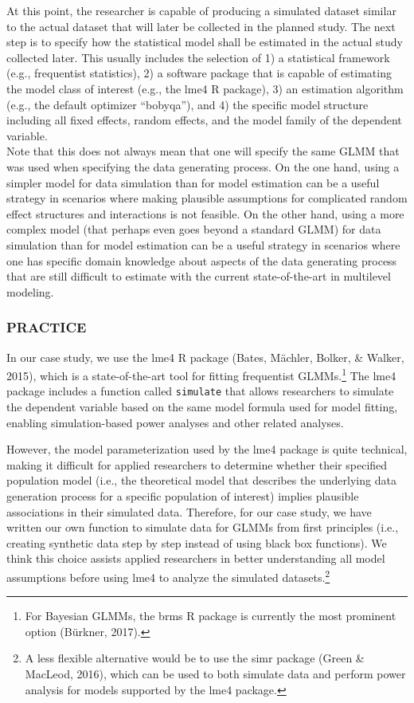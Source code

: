 \documentclass[
  man,floatsintext]{apa6}
\begin{document}
At this point, the researcher is capable of producing a simulated dataset similar to the actual dataset that will later be collected in the planned study.
The next step is to specify how the statistical model shall be estimated in the actual study collected later.
This usually includes the selection of 1) a statistical framework (e.g., frequentist statistics), 2) a software package that is capable of estimating the model class of interest (e.g., the lme4 R package), 3) an estimation algorithm (e.g., the default optimizer ``bobyqa''), and 4) the specific model structure including all fixed effects, random effects, and the model family of the dependent variable.\\
Note that this does not always mean that one will specify the same GLMM that was used when specifying the data generating process.
On the one hand, using a simpler model for data simulation than for model estimation can be a useful strategy in scenarios where making plausible assumptions for complicated random effect structures and interactions is not feasible.
On the other hand, using a more complex model (that perhaps even goes beyond a standard GLMM) for data simulation than for model estimation can be a useful strategy in scenarios where one has specific domain knowledge about aspects of the data generating process that are still difficult to estimate with the current state-of-the-art in multilevel modeling.

\hypertarget{practice-6}{%
\subsubsection{PRACTICE}\label{practice-6}}

In our case study, we use the lme4 R package (Bates, Mächler, Bolker, \& Walker, 2015), which is a state-of-the-art tool for fitting frequentist GLMMs.\footnote{For Bayesian GLMMs, the brms R package is currently the most prominent option (Bürkner, 2017).}
The lme4 package includes a function called \texttt{simulate} that allows researchers to simulate the dependent variable based on the same model formula used for model fitting, enabling simulation-based power analyses and other related analyses.

However, the model parameterization used by the lme4 package is quite technical, making it difficult for applied researchers to determine whether their specified population model (i.e., the theoretical model that describes the underlying data generation process for a specific population of interest) implies plausible associations in their simulated data. Therefore, for our case study, we have written our own function to simulate data for GLMMs from first principles (i.e., creating synthetic data step by step instead of using black box functions).
We think this choice assists applied researchers in better understanding all model assumptions before using lme4 to analyze the simulated datasets.\footnote{A less flexible alternative would be to use the simr package (Green \& MacLeod, 2016), which can be used to both simulate data and perform power analysis for models supported by the lme4 package.}
\end{document}
